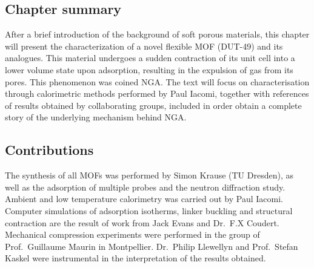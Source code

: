 \subsection*{Chapter summary}

After a brief introduction of the background of soft porous 
materials, this chapter will present the characterization of a novel
flexible \gls{MOF} (DUT-49) and its analogues. This material undergoes
a sudden contraction of its unit cell into a lower volume state
upon adsorption, resulting in the expulsion of gas from its pores.
This phenomenon was coined \gls{NGA}.
The text will focus on characterisation through calorimetric methods
performed by Paul Iacomi, together with references
of results obtained by collaborating groups, included in order
obtain a complete story of the underlying mechanism behind \gls{NGA}.

\subsection*{Contributions}

The synthesis of all \glspl{MOF} was performed by Simon Krause
(TU Dresden), as well as the adsorption of multiple probes 
and the neutron diffraction study.
Ambient and low temperature calorimetry was carried out by 
Paul Iacomi. Computer simulations of adsorption isotherms, 
linker buckling and structural contraction
are the result of work from Jack Evans and Dr.\ F.X Coudert.
Mechanical compression experiments were performed in 
the group of Prof.\ Guillaume Maurin in Montpellier.
Dr.\ Philip Llewellyn and Prof.\ Stefan Kaskel were 
instrumental in the interpretation of the results obtained.
